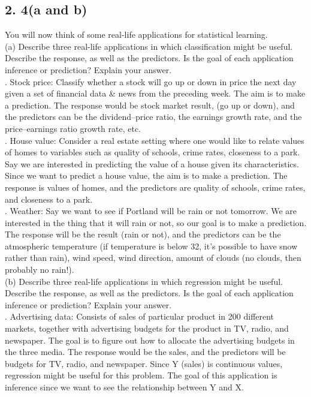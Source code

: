 \documentclass{article}
\begin{document}
\subsection*{2. 4(a and b)}
You will now think of some real-life applications for statistical learning. \\
(a) Describe three real-life applications in which classification might be useful. Describe the response, as well as the predictors. Is the goal of each application inference or prediction? Explain your answer. \\
\indent{}. Stock price: Classify whether a stock will go up or down in price the next day given a set of financial data \& news from the preceding week. The aim is to make a prediction. The response would be stock market result, (go up or down), and the predictors can be the dividend–price ratio, the earnings growth rate, and the price–earnings ratio growth rate, etc. \\
\indent{}. House value: Consider a real estate setting where one would like to relate values of homes to variables such as quality of schools, crime rates, closeness to a park. Say we are interested in predicting the value of a house given its characteristics. Since we want to predict a house value, the aim is to make a prediction. The response is values of homes, and the predictors are quality of schools, crime rates, and closeness to a park. \\
\indent{}. Weather: Say we want to see if Portland will be rain or not tomorrow. We are interested in the thing that it will rain or not, so our goal is to make a prediction. The response will be the result (rain or not), and the predictors can be the atmospheric temperature (if temperature is below 32, it's possible to have snow rather than rain), wind speed, wind direction, amount of clouds (no clouds, then probably no rain!). \\
\linebreak (b) Describe three real-life applications in which regression might be useful. Describe the response, as well as the predictors. Is the goal of each application inference or prediction? Explain your answer. \\
\indent{}. Advertising data: Consists of sales of particular product in 200 different markets, together with advertising budgets for the product in TV, radio, and newspaper. The goal is to figure out how to allocate the advertising budgets in the three media. The response would be the sales, and the predictors will be budgets for TV, radio, and newspaper. Since Y (sales) is continuous values, regression might be useful for this problem. The goal of this application is inference since we want to see the relationship between Y and X. \\
\end{document}
